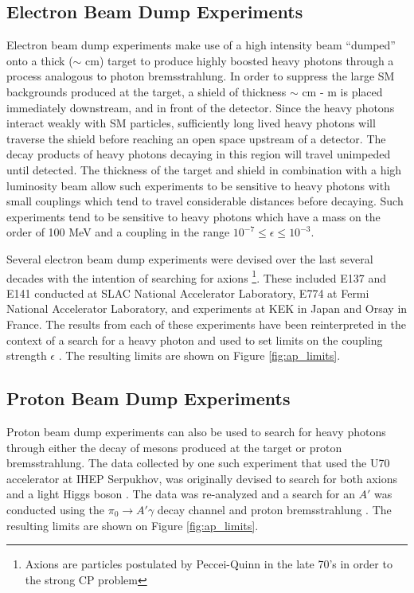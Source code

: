 \subsection{Electron Beam Dump Experiments}

Electron beam dump experiments make use of a high intensity beam ``dumped'' onto
a thick ($\sim$ cm) target to produce highly boosted heavy photons through a 
process analogous to photon bremsstrahlung.  In order to suppress the large
SM backgrounds produced at the target, a shield of thickness $\sim$ cm - m
is placed immediately downstream, and in front of the detector.  Since the 
heavy photons interact weakly with SM particles, sufficiently long lived 
heavy photons will traverse the shield before reaching an open space upstream
of a detector.  The decay products of heavy photons decaying in this region 
will travel unimpeded until detected.
The thickness of the target and shield in combination with a high luminosity
beam allow such experiments to be sensitive to heavy photons with small 
couplings which tend to travel considerable distances before decaying. Such 
experiments tend to be sensitive to heavy photons which have a mass on the order
of 100 MeV and a coupling in the range $10^{-7} \le \epsilon \le 10^{-3}$.


Several electron beam dump experiments were devised over the last several decades with
the intention of searching for axions \footnote{Axions are particles postulated 
by Peccei-Quinn in the late 70's in order to the strong CP problem}.  These 
included E137 \cite{Bjorken:1988as}
and E141 \cite{riordan1987} conducted at SLAC National Accelerator Laboratory,
E774 \cite{bross1991} at Fermi National Accelerator Laboratory, and experiments at 
KEK \cite{konaka1986} in Japan and Orsay \cite{davier1989} in France. 
The results from each of these experiments have been reinterpreted in the 
context of a search for a heavy photon and used to set limits on the coupling
strength $\epsilon$ \cite{Bjorken:2009mm, andreas2012}.  The resulting limits are 
shown on Figure \ref{fig:ap_limits}.

\subsection{Proton Beam Dump Experiments}

Proton beam dump experiments can also be used to search for heavy photons
through either the decay of mesons produced at the target or proton
bremsstrahlung.  The data collected by one such experiment that used the U70
accelerator at IHEP Serpukhov, was originally devised to search for both axions
and a light Higgs boson \cite{Blumlein:1990ay, Blumlein:1991xh}.  The data was 
re-analyzed and a search for an $A'$ was conducted
using the $\pi_0 \rightarrow A'\gamma$ decay channel and proton bremsstrahlung
\cite{johannes2011, johannes2014}. The resulting limits are shown on Figure 
\ref{fig:ap_limits}.

